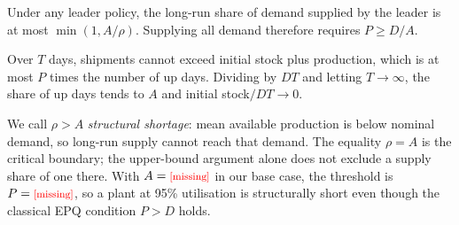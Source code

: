 \documentclass{ifacconf}
\newcommand{\rev}[1]{#1}
\newcommand{\MissingResult}{\ifmmode\text{\normalfont\color{red}\footnotesize[missing]}\else{\normalfont\color{red}\footnotesize[missing]}\fi}
\providecommand{\Aval}{\MissingResult}
\providecommand{\DoverA}{\MissingResult}
\begin{document}
\begin{prop}\label{prop:cap}
Under any leader policy, the long-run share of demand supplied by the leader is at most $\min(1,A/\rho)$. Supplying all demand therefore requires $P\ge D/A$.
\end{prop}
\begin{pf}
Over $T$ days, shipments cannot exceed initial stock plus production, which is at most $P$ times the number of up days. Dividing by $DT$ and letting $T\to\infty$, the share of up days tends to $A$ and initial stock$/DT\to0$.
\end{pf}
\noindent \rev{We call $\rho>A$ \emph{structural shortage}: mean available production is below nominal demand, so long-run supply cannot reach that demand. The equality $\rho=A$ is the critical boundary; the upper-bound argument alone does not exclude a supply share of one there.} With $A=\Aval$ in our base case, the threshold is $P=\DoverA$, so a plant at 95\% utilisation is structurally short even though the classical EPQ condition $P>D$ holds.

\end{document}
